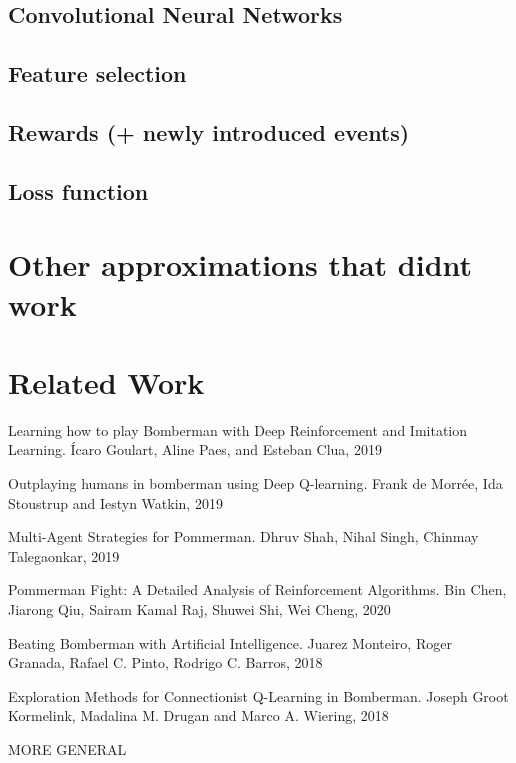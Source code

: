 \documentclass[a4paper ,12pt]{report}
\begin{document}
	\section{Convolutional Neural Networks}
	
	\section{Feature selection}
	
	\section{Rewards (+ newly introduced events)}
	
	\section{Loss function}
	
	\chapter{Other approximations that didnt work}
	
	
	\chapter{Related Work}
	Learning how to play Bomberman with Deep Reinforcement and Imitation Learning. Ícaro Goulart, Aline Paes, and Esteban Clua, 2019 \cite{GoulartBomberman}
	
	Outplaying humans in bomberman using Deep Q-learning. Frank de Morrée, Ida Stoustrup and Iestyn Watkin, 2019 \cite{AlanPresentation}
	
	Multi-Agent Strategies for Pommerman. Dhruv Shah, Nihal Singh, Chinmay Talegaonkar, 2019 \cite{Pommerman}
	
	Pommerman Fight: A Detailed Analysis of Reinforcement Algorithms. Bin Chen, Jiarong Qiu, Sairam Kamal Raj, Shuwei Shi, Wei Cheng, 2020 \cite{PommAnalysis}
	
	Beating Bomberman with Artificial Intelligence. Juarez Monteiro, Roger Granada, Rafael C. Pinto, Rodrigo C. Barros, 2018 \cite{BeatBomberman2018}
	
	Exploration Methods for Connectionist Q-Learning in Bomberman. Joseph Groot Kormelink, Madalina M. Drugan and Marco A. Wiering, 2018 \cite{ExploreConnectionistQLearning}
	
	MORE GENERAL
	
	\cite{DeepQNet}
	
\end{document}

